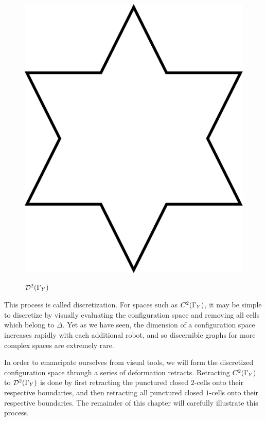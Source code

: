 \begin{figure}[h]
\centering
\caption{$\mathcal{D}^2(\Gamma_Y)$}
\includegraphics[scale=.5]{discretized.png}
\label{fig:star}
\end{figure}

This process is called discretization. For spaces such as $C^2(\Gamma_Y)$, it may be simple to discretize by visually evaluating the configuration space and removing all cells which belong to $\tilde{\Delta}$. Yet as we have seen, the dimension of a configuration space increases rapidly with each additional robot, and so discernible graphs for more complex spaces are extremely rare. 

In order to emancipate ourselves from visual tools, we will form the discretized configuration space through a series of deformation retracts. Retracting $C^2(\Gamma_Y)$ to $\mathcal{D}^2(\Gamma_Y)$ is done by first retracting the punctured closed $2$-cells onto their respective boundaries, and then retracting all punctured closed $1$-cells onto their respective boundaries. The remainder of this chapter will carefully illustrate this process.

